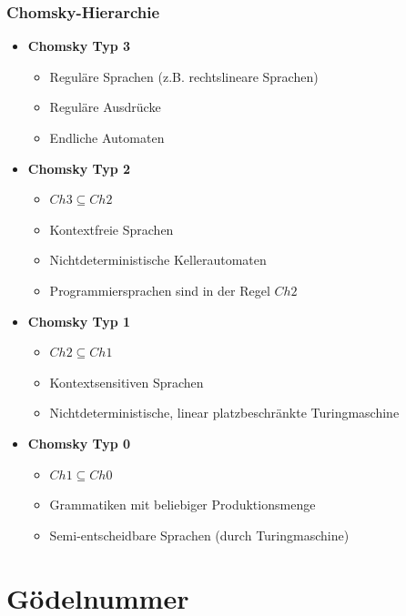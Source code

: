 \begin{frame}
	\frametitle{Chomsky-Hierarchie}
	\begin{itemize}
		\item \textbf{Chomsky Typ 3}
		\begin{itemize}
			\item Reguläre Sprachen (z.B. rechtslineare Sprachen)
			\item Reguläre Ausdrücke
			\item Endliche Automaten
		\end{itemize}
		\item \textbf{Chomsky Typ 2}
		\begin{itemize}
			\item $Ch3 \subseteq Ch2$
			\item Kontextfreie Sprachen
			\item Nichtdeterministische Kellerautomaten
			\item Programmiersprachen sind in der Regel $Ch2$
		\end{itemize}
		\item \textbf{Chomsky Typ 1}
		\begin{itemize}
			\item $Ch2 \subseteq Ch1$
			\item Kontextsensitiven Sprachen
			\item Nichtdeterministische, linear platzbeschränkte Turingmaschine
		\end{itemize}
		\item \textbf{Chomsky Typ 0}
		\begin{itemize}
			\item $Ch1 \subseteq Ch0$
			\item Grammatiken mit beliebiger Produktionsmenge
			\item Semi-entscheidbare Sprachen (durch Turingmaschine)
		\end{itemize}
	\end{itemize}
\end{frame}

\section{Gödelnummer}
